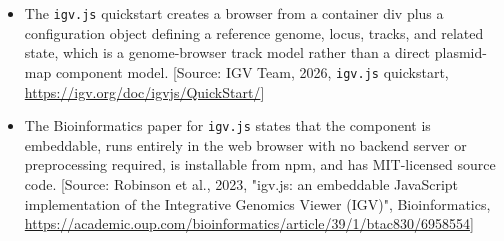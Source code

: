\documentclass[11pt]{report}
\begin{document}
\begin{itemize}
\item The \texttt{igv.js} quickstart creates a browser from a container div plus a configuration object defining a reference genome, locus, tracks, and related state, which is a genome-browser track model rather than a direct plasmid-map component model. [Source: IGV Team, 2026, \texttt{igv.js} quickstart, \url{https://igv.org/doc/igvjs/QuickStart/}]
\item The Bioinformatics paper for \texttt{igv.js} states that the component is embeddable, runs entirely in the web browser with no backend server or preprocessing required, is installable from npm, and has MIT-licensed source code. [Source: Robinson et al., 2023, "igv.js: an embeddable JavaScript implementation of the Integrative Genomics Viewer (IGV)", Bioinformatics, \url{https://academic.oup.com/bioinformatics/article/39/1/btac830/6958554}]
\end{itemize}
\end{document}
